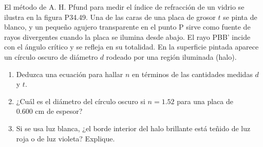 \item El método de A. H. Pfund para medir el índice de refracción de un vidrio se ilustra en la figura P34.49. Una de las caras de una placa de grosor $t$ se pinta de blanco, y un pequeño agujero transparente en el punto P sirve como fuente de rayos divergentes cuando la placa se ilumina desde abajo. El rayo PBB' incide con el ángulo crítico y se refleja en su totalidad. En la superficie pintada aparece un círculo oscuro de diámetro $d$ rodeado por una región iluminada (halo).
\begin{enumerate}
    \item Deduzca una ecuación para hallar $n$ en términos de las cantidades medidas $d$ y $t$.
    \item ¿Cuál es el diámetro del círculo oscuro si $n = 1.52$ para una placa de $0.600\text{ cm}$ de espesor?
    \item Si se usa luz blanca, ¿el borde interior del halo brillante está teñido de luz roja o de luz violeta? Explique.
\end{enumerate}